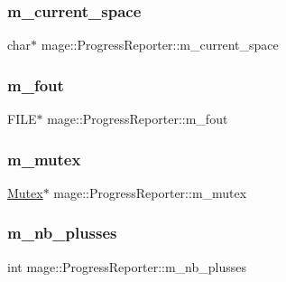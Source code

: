 \subsubsection{\texorpdfstring{m\+\_\+current\+\_\+space}{m\_current\_space}}
{\footnotesize\ttfamily char$\ast$ mage\+::\+Progress\+Reporter\+::m\+\_\+current\+\_\+space\hspace{0.3cm}{\ttfamily [private]}}

\hypertarget{classmage_1_1_progress_reporter_ad325ee5978fd1d16a97acbe37a977982}{}\label{classmage_1_1_progress_reporter_ad325ee5978fd1d16a97acbe37a977982} 
\subsubsection{\texorpdfstring{m\+\_\+fout}{m\_fout}}
{\footnotesize\ttfamily F\+I\+LE$\ast$ mage\+::\+Progress\+Reporter\+::m\+\_\+fout\hspace{0.3cm}{\ttfamily [private]}}

\hypertarget{classmage_1_1_progress_reporter_abda37942e51b682b2871e49883d58da1}{}\label{classmage_1_1_progress_reporter_abda37942e51b682b2871e49883d58da1} 
\subsubsection{\texorpdfstring{m\+\_\+mutex}{m\_mutex}}
{\footnotesize\ttfamily \hyperlink{classmage_1_1_mutex}{Mutex}$\ast$ mage\+::\+Progress\+Reporter\+::m\+\_\+mutex\hspace{0.3cm}{\ttfamily [private]}}

\hypertarget{classmage_1_1_progress_reporter_abee761d058d9a3d6d56189b86e6daae6}{}\label{classmage_1_1_progress_reporter_abee761d058d9a3d6d56189b86e6daae6} 
\subsubsection{\texorpdfstring{m\+\_\+nb\+\_\+plusses}{m\_nb\_plusses}}
{\footnotesize\ttfamily int mage\+::\+Progress\+Reporter\+::m\+\_\+nb\+\_\+plusses\hspace{0.3cm}{\ttfamily [private]}}

